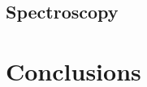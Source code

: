\documentclass[10pt]{article}
\begin{document}
\subsection{Spectroscopy}


\section{Conclusions}\label{conclusions}


%
%
\end{document}
